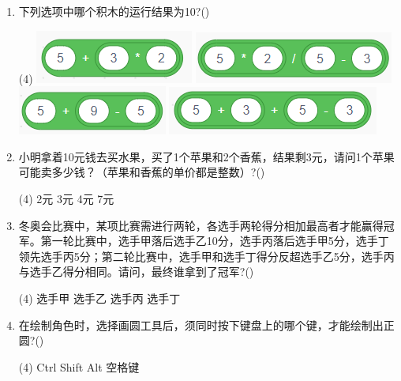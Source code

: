 \documentclass[10pt, a4paper]{article}
\begin{document}
\begin{enumerate}
        \item 下列选项中哪个积木的运行结果为10?(\qquad)
        \begin{tasks}(4)
            \task \includegraphics[width=.13\textwidth]{10a.png}
            \task \includegraphics[width=.18\textwidth]{10b.png}
            \task \includegraphics[width=.13\textwidth]{10c.png}
            \task \includegraphics[width=.18\textwidth]{10d.png}
        \end{tasks}

        \item 小明拿着10元钱去买水果，买了1个苹果和2个香蕉，结果剩3元，请问1个苹果可能卖多少钱？（苹果和香蕉的单价都是整数）?(\qquad)
        \begin{tasks}(4)
            \task 2元
            \task 3元
            \task 4元
            \task 7元
        \end{tasks}

        \item 冬奥会比赛中，某项比赛需进行两轮，各选手两轮得分相加最高者才能赢得冠军。第一轮比赛中，选手甲落后选手乙10分，选手丙落后选手甲5分，选手丁领先选手丙5分；第二轮比赛中，选手甲和选手丁得分反超选手乙5分，选手丙与选手乙得分相同。请问，最终谁拿到了冠军?(\qquad)
        \begin{tasks}(4)
            \task 选手甲
            \task 选手乙
            \task 选手丙
            \task 选手丁
        \end{tasks}

        \item 在绘制角色时，选择画圆工具后，须同时按下键盘上的哪个键，才能绘制出正圆?(\qquad)
        \begin{tasks}(4)
            \task Ctrl
            \task Shift
            \task Alt
            \task 空格键
        \end{tasks}
        

\end{enumerate}
\end{document}
